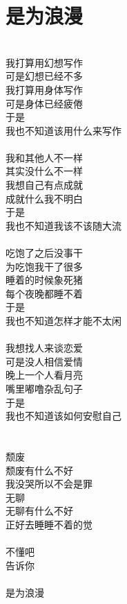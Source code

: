 \section{是为浪漫}
\leftskip=30mm
\noindent \\
我打算用幻想写作\\
可是幻想已经不多\\
我打算用身体写作\\
可是身体已经疲倦\\
于是\\
我也不知道该用什么来写作\\
\\
我和其他人不一样\\
其实没什么不一样\\
我想自己有点成就\\
成就什么我不明白\\
于是\\
我也不知道我该不该随大流\\
\\
吃饱了之后没事干\\
为吃饱我干了很多\\
睡着的时候象死猪\\
每个夜晚都睡不着\\
于是\\
我也不知道怎样才能不太闲\\
\\
我想找人来谈恋爱\\
可是没人相信爱情\\
晚上一个人看月亮\\
嘴里嘟噜杂乱句子\\
于是\\
我也不知道该如何安慰自己\\
\\
\\
颓废\\
颓废有什么不好\\
我没哭所以不会是罪\\
无聊\\
无聊有什么不好\\
正好去睡睡不着的觉\\
\\
不懂吧\\
告诉你\\
\\
是为浪漫